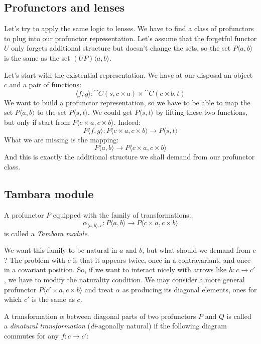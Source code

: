 \documentclass[DaoFP]{subfiles}
\begin{document}
\subsection{Profunctors and lenses}

Let's try to apply the same logic to lenses. We have to find a class of profunctors to plug into our profunctor representation. Let's assume that the forgetful functor $U$ only forgets additional structure but doesn't change the sets, so the set $P \langle a, b \rangle$ is the same as the set $(U P) \langle a, b \rangle$. 

Let's start with the existential representation. We have at our disposal an object $c$ and a pair of functions:
\[  \langle f, g \rangle \colon \cat C(s, c \times a) \times \cat C(c \times b, t) \]
We want to build a profunctor representation, so we have to be able to map the set $P \langle a, b \rangle$ to the set $P \langle s, t \rangle$. We could get $P \langle s, t \rangle$ by lifting these two functions, but only if start from $P \langle c \times a, c \times b \rangle$. Indeed:
\[ P \langle f, g \rangle \colon P \langle c \times a, c \times b \rangle \to P \langle s, t \rangle \]
What we are missing is the mapping:
\[ P \langle a, b \rangle \to P \langle c \times a, c \times b \rangle \]
And this is exactly the additional structure we shall demand from our profunctor class. 

\subsection{Tambara module}

A profunctor $P$ equipped with the family of transformations:
\[ \alpha_{\langle a, b\rangle, c} \colon P \langle a, b \rangle \to P \langle c \times a, c \times b \rangle \]
is called a \emph{Tambara module}. 

We want this family to be natural in $a$ and $b$, but what should we demand from $c$? The problem with $c$ is that it appears twice, once in a contravariant, and once in a covariant position. So, if we want to interact nicely with arrows like $h \colon c \to c'$, we have to modify the naturality condition. We may consider a more general profunctor $P \langle c' \times a, c \times b \rangle$ and treat $\alpha$ as producing its diagonal elements, ones for which $c'$ is the same as $c$. 

A transformation $\alpha$ between diagonal parts of two profunctors $P$ and $Q$ is called a \emph{dinatural transformation} (\emph{di}-agonally natural) if the following diagram commutes for any $f \colon c \to c'$:
\end{document}
